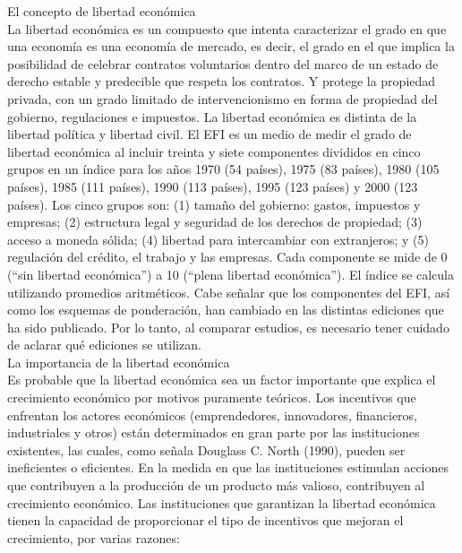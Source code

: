     El concepto de libertad económica\\
    La libertad económica es un compuesto que intenta caracterizar el grado en que una economía es una economía de mercado, es decir, el grado en el que implica la posibilidad de celebrar contratos voluntarios dentro del marco de un estado de derecho estable y predecible que respeta los contratos. Y protege la propiedad privada, con un grado limitado de intervencionismo en forma de propiedad del gobierno, regulaciones e impuestos. La libertad económica es distinta de la libertad política y  libertad civil.  El EFI es un medio de medir el grado de libertad económica al incluir treinta y siete componentes divididos en cinco grupos en un índice para los años 1970 (54 países), 1975 (83 países), 1980 (105 países), 1985 (111 países), 1990 (113 países), 1995 (123 países) y 2000 (123 países). Los cinco grupos son: (1) tamaño del gobierno: gastos, impuestos y empresas; (2) estructura legal y seguridad de los derechos de propiedad; (3) acceso a moneda sólida; (4) libertad para intercambiar con extranjeros; y (5) regulación del crédito, el trabajo y las empresas. Cada componente se mide de 0 (“sin libertad económica”) a 10 (“plena libertad económica”). El índice se calcula utilizando promedios aritméticos. Cabe señalar que los componentes del EFI, así como los esquemas de ponderación, han cambiado en las distintas ediciones que ha sido publicado. Por lo tanto, al comparar estudios, es necesario tener cuidado de aclarar qué ediciones se utilizan.\\

    La importancia de la libertad económica\\
    Es probable que la libertad económica sea un factor importante que explica el crecimiento económico por motivos puramente teóricos. Los incentivos que enfrentan los actores económicos (emprendedores, innovadores, financieros, industriales y otros) están determinados en gran parte por las instituciones existentes, las cuales, como señala Douglass C. North (1990), pueden ser ineficientes o eficientes. En la medida en que las instituciones estimulan acciones que contribuyen a la producción de un producto más valioso, contribuyen al crecimiento económico. Las instituciones que garantizan la libertad económica tienen la capacidad de proporcionar el tipo de incentivos que mejoran el crecimiento, por varias razones:\\

